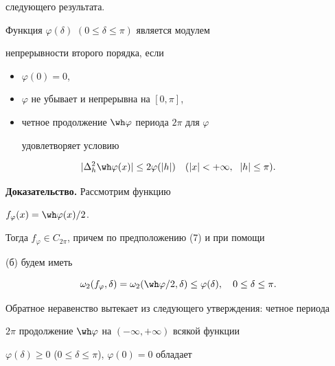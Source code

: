 следующего результата. 


 


\begin{thm} 


Функция $\varphi(\delta)$ $(0\le\delta\le\pi)$ является модулем 


непрерывности второго порядка, если 


\begin{itemize} 


\item[(a)] $\varphi(0)=0$, 


\item[(б)] $\varphi$ не убывает и непрерывна на $[0,\pi]$, 


\item[(в)] четное продолжение $\wh\varphi$ периода $2\pi$ для $\varphi$ 


удовлетворяет условию 


\end{itemize} 


\begin{equation} 


|\Delta^2_h\wh\varphi(x)|\le 2\varphi(|h|)\quad 


(|x|<+\infty, \ \; |h|\le\pi). 


\end{equation} 


\end{thm} 


 


{\bf Доказательство.} Рассмотрим функцию 


$f_\varphi(x)=\wh\varphi(x)/2$. 


Тогда $f_\varphi\in C_{2\pi}$, причем по предположению (7) и при помощи 


(б) будем иметь 


\begin{equation} 


\omega_2(f_\varphi,\delta)=\omega_2(\wh\varphi/2,\delta) 


\le\varphi(\delta),\quad 0\le\delta\le\pi. 


\end{equation} 


Обратное неравенство вытекает из следующего утверждения: четное периода 


$2\pi$ продолжение $\wh\varphi$ на $(-\infty,+\infty)$ всякой функции 


$\varphi(\delta)\ge 0$ ($0\le\delta\le\pi$), $\varphi(0)=0$ обладает 


